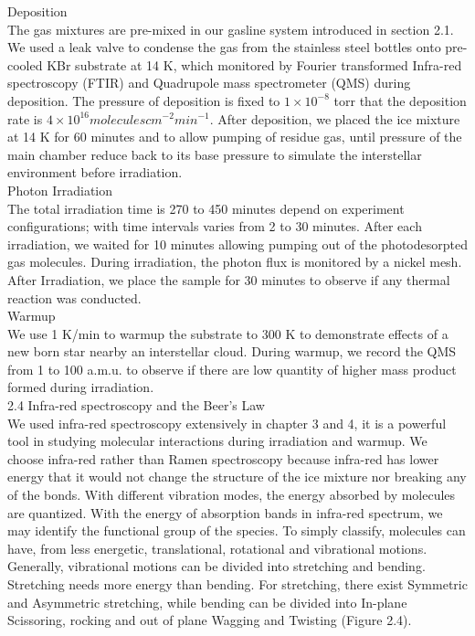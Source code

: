Deposition\\
The gas mixtures are pre-mixed in our gasline system introduced in section 2.1. We used a leak valve to condense the gas from the stainless steel bottles onto pre-cooled KBr substrate at 14 K, which monitored by Fourier transformed Infra-red spectroscopy (FTIR) and Quadrupole mass spectrometer (QMS) during deposition. The pressure of deposition is fixed to $1 \times 10^{-8}$ torr that the deposition rate is $4 \times 10^{16} molecules cm^{-2} min^{-1}$. After deposition, we placed the ice mixture at 14 K for 60 minutes and to allow pumping of residue gas, until pressure of the main chamber reduce back to its base pressure to simulate the interstellar environment before irradiation.\\

Photon Irradiation\\
The total irradiation time is 270 to 450 minutes depend on experiment configurations; with time intervals varies from 2 to 30 minutes. After each irradiation, we waited for 10 minutes allowing pumping out of the photodesorpted gas molecules. During irradiation, the photon flux is monitored by a nickel mesh. After Irradiation, we place the sample for 30 minutes to observe if any thermal reaction was conducted.\\

Warmup\\
We use 1 K/min to warmup the substrate to 300 K to demonstrate effects of a new born star nearby an interstellar cloud. During warmup, we record the QMS from 1 to 100 a.m.u. to observe if there are low quantity of higher mass product formed during irradiation.\\

2.4 Infra-red spectroscopy and the Beer’s Law\\
We used infra-red spectroscopy extensively in chapter 3 and 4, it is a powerful tool in studying molecular interactions during irradiation and warmup. We choose infra-red rather than Ramen spectroscopy because infra-red has lower energy that it would not change the structure of the ice mixture nor breaking any of the bonds. With different vibration modes, the energy absorbed by molecules are quantized. With the energy of absorption bands in infra-red spectrum, we may identify the functional group of the species. To simply classify, molecules can have, from less energetic, translational, rotational and vibrational motions. Generally, vibrational motions can be divided into stretching and bending. Stretching needs more energy than bending. For stretching, there exist Symmetric and Asymmetric stretching, while bending can be divided into In-plane Scissoring, rocking and out of plane Wagging and Twisting (Figure 2.4).\\

